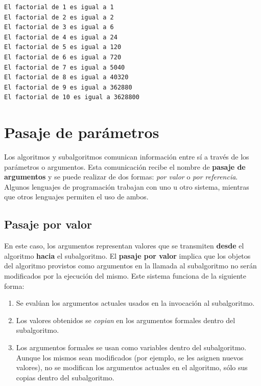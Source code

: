 \documentclass[
]{book}
\providecommand{\tightlist}{%
  \setlength{\itemsep}{0pt}\setlength{\parskip}{0pt}}
\begin{document}
\begin{verbatim}
El factorial de 1 es igual a 1 
El factorial de 2 es igual a 2 
El factorial de 3 es igual a 6 
El factorial de 4 es igual a 24 
El factorial de 5 es igual a 120 
El factorial de 6 es igual a 720 
El factorial de 7 es igual a 5040 
El factorial de 8 es igual a 40320 
El factorial de 9 es igual a 362880 
El factorial de 10 es igual a 3628800 
\end{verbatim}

\hypertarget{pasaje-de-paruxe1metros}{%
\section{Pasaje de parámetros}\label{pasaje-de-paruxe1metros}}

Los algoritmos y subalgoritmos comunican información entre sí a través de los parámetros o argumentos. Esta comunicación recibe el nombre de \textbf{pasaje de argumentos} y se puede realizar de dos formas: \emph{por valor} o \emph{por referencia}. Algunos lenguajes de programación trabajan con uno u otro sistema, mientras que otros lenguajes permiten el uso de ambos.

\hypertarget{pasaje-por-valor}{%
\subsection{Pasaje por valor}\label{pasaje-por-valor}}

En este caso, los argumentos representan valores que se transmiten \textbf{desde} el algoritmo \textbf{hacia} el subalgoritmo. El \textbf{pasaje por valor} implica que los objetos del algoritmo provistos como argumentos en la llamada al subalgoritmo no serán modificados por la ejecución del mismo. Este sistema funciona de la siguiente forma:

\begin{enumerate}
\def\labelenumi{\arabic{enumi}.}
\tightlist
\item
  Se evalúan los argumentos actuales usados en la invocación al subalgoritmo.
\item
  Los valores obtenidos se \emph{copian} en los argumentos formales dentro del subalgoritmo.
\item
  Los argumentos formales se usan como variables dentro del subalgoritmo. Aunque los mismos sean modificados (por ejemplo, se les asignen nuevos valores), no se modifican los argumentos actuales en el algoritmo, sólo sus copias dentro del subalgoritmo.
\end{enumerate}
\end{document}
